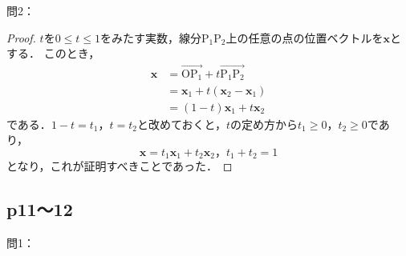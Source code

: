 \documentclass[dvipdfmx,uplatex,11pt]{jsarticle}
\theoremstyle{definition}
\begin{document}
問2：
\begin{leftbar}
    \begin{proof}
        $t$を$0 \le t \le 1$をみたす実数，線分$\mathrm{P_1 P_2}$上の任意の点の位置ベクトルを$\bm{x}$とする．
        このとき，
        \begin{align*}
            \bm{x} & = \overrightarrow{\mathrm{O P_1}}+t\overrightarrow{\mathrm{P_1 P_2}} \\
            & = \bm{x}_1 + t (\bm{x}_2 - \bm{x}_1) \\
             &= (1-t) \bm{x}_1 + t \bm{x}_2
        \end{align*}
        である．$1-t = t_1$，$t=t_2$と改めておくと，$t$の定め方から$t_1 \ge 0$，$t_2 \ge 0$であり，
        \[
            \bm{x}= t_1 \bm{x}_1 + t_2 \bm{x}_2 ，t_1 + t_2 =1
        \]
        となり，これが証明すべきことであった．
    \end{proof}
\end{leftbar}

\newpage
\subsection{p11～12}

問1：
\end{document}
